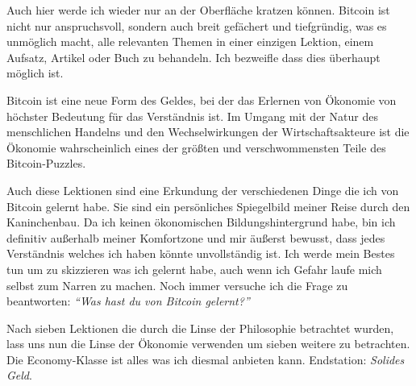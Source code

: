 Auch hier werde ich wieder nur an der Oberfläche kratzen können. Bitcoin ist
nicht nur anspruchsvoll, sondern auch breit gefächert und tiefgründig, was es
unmöglich macht, alle relevanten Themen in einer einzigen Lektion, einem
Aufsatz, Artikel oder Buch zu behandeln. Ich bezweifle dass dies überhaupt
möglich ist.

Bitcoin ist eine neue Form des Geldes, bei der das Erlernen von Ökonomie von
höchster Bedeutung für das Verständnis ist. Im Umgang mit der Natur des
menschlichen Handelns und den Wechselwirkungen der Wirtschaftsakteure ist die
Ökonomie wahrscheinlich eines der größten und verschwommensten Teile des
Bitcoin-Puzzles.

Auch diese Lektionen sind eine Erkundung der verschiedenen Dinge die ich von
Bitcoin gelernt habe. Sie sind ein persönliches Spiegelbild meiner Reise durch
den Kaninchenbau. Da ich keinen ökonomischen Bildungshintergrund habe, bin ich
definitiv außerhalb meiner Komfortzone und mir äußerst bewusst, dass jedes
Verständnis welches ich haben könnte unvollständig ist. Ich werde mein Bestes
tun um zu skizzieren was ich gelernt habe, auch wenn ich Gefahr laufe mich
selbst zum Narren zu machen. Noch immer versuche ich die Frage zu beantworten:
\textit{\enquote{Was hast du von Bitcoin gelernt?}}

Nach sieben Lektionen die durch die Linse der Philosophie betrachtet wurden,
lass uns nun die Linse der Ökonomie verwenden um sieben weitere zu betrachten.
Die Economy-Klasse ist alles was ich diesmal anbieten kann. Endstation:
\textit{Solides Geld}.

